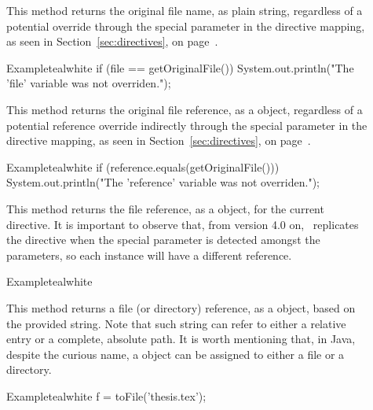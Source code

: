\begin{description}
\item[] This method returns the original file name, as plain string, regardless of a potential override through the special  parameter in the directive mapping, as seen in Section~\ref{sec:directives}, on page~\pageref{sec:directives}.

\begin{codebox}{Example}{teal}{\icnote}{white}
if (file == getOriginalFile()) {
    System.out.println("The 'file' variable
       was not overriden.");
}
\end{codebox}

\item[] This method returns the original file reference, as a  object, regardless of a potential reference override indirectly through the special  parameter in the directive mapping, as seen in Section~\ref{sec:directives}, on page~\pageref{sec:directives}.

\begin{codebox}{Example}{teal}{\icnote}{white}
if (reference.equals(getOriginalFile())) {
    System.out.println("The 'reference' variable
       was not overriden.");
}
\end{codebox}

\item[] This method returns the file reference, as a  object, for the current directive. It is important to observe that, from version 4.0 on, \arara\ replicates the directive when the special  parameter is detected amongst the parameters, so each instance will have a different reference.

\begin{codebox}{Example}{teal}{\icnote}{white}
\end{codebox}

\item[] This method returns a file (or directory) reference, as a  object, based on the provided string. Note that such string can refer to either a relative entry or a complete, absolute path. It is worth mentioning that, in Java, despite the curious name, a  object can be assigned to either a file or a directory.

\begin{codebox}{Example}{teal}{\icnote}{white}
f = toFile('thesis.tex');
\end{codebox}


\end{description}
